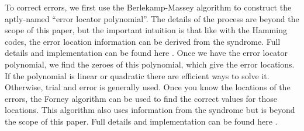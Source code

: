 \documentclass{article}
\begin{document}
To correct errors, we first use the Berlekamp-Massey algorithm to construct the aptly-named ``error locator polynomial''. The details of the process are beyond the scope of this paper, but the important intuition is that like with the Hamming codes, the error location information can be derived from the syndrome. Full details and implementation can be found here \cite{wikiversity}. Once we have the error locator polynomial, we find the zeroes of this polynomial, which give the error locations. If the polynomial is linear or quadratic there are efficient ways to solve it. Otherwise, trial and error is generally used. Once you know the locations of the errors, the Forney algorithm can be used to find the correct values for those locations. This algorithm also uses information from the syndrome but is beyond the scope of this paper. Full details and implementation can be found here \cite{wikiversity}.




\end{document}
